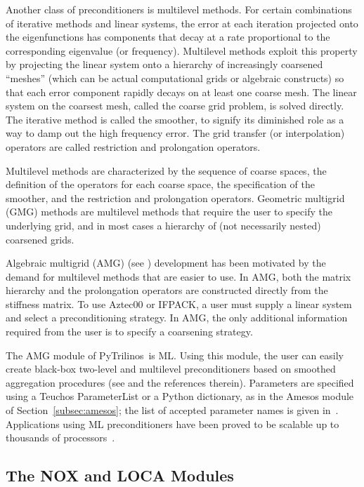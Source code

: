 \documentclass[acmtocl]{acmtrans2m}
\newcommand{\PyTrilinos}{{PyTrilinos}}
\begin{document}
Another class of preconditioners is multilevel methods. For certain
combinations of iterative methods and linear systems, the error at
each iteration projected onto the eigenfunctions has components that
decay at a rate proportional to the corresponding eigenvalue (or
frequency).  Multilevel methods exploit this property \cite{Briggs}
by projecting the linear system onto a hierarchy of increasingly
coarsened ``meshes'' (which can be actual computational grids or
algebraic constructs) so that each error component rapidly decays on
at least one coarse mesh.  The linear system on the coarsest mesh,
called the coarse grid problem, is solved directly. The iterative
method is called the smoother, to signify its diminished role as a
way to damp out the high frequency error.  The grid transfer (or
interpolation) operators are called restriction and prolongation
operators.

Multilevel methods are characterized by the sequence of coarse spaces,
the definition of the operators for each coarse space, the
specification of the smoother, and the restriction and prolongation
operators.  Geometric multigrid (GMG) methods are multilevel methods
that require the user to specify the underlying grid, and in most
cases a hierarchy of (not necessarily nested) coarsened grids.

Algebraic multigrid (AMG) (see \cite[Section 8]{Briggs}) development
has been motivated by the demand for multilevel methods that are
easier to use.  In AMG, both the matrix hierarchy and the prolongation
operators are constructed directly from the stiffness matrix.  To use
Aztec00 or IFPACK, a user must supply a linear system and select a
preconditioning strategy.  In AMG, the only additional information
required from the user is to specify a coarsening strategy.

The AMG module of \PyTrilinos\ is ML.  Using this module, the user can
easily create black-box two-level and multilevel preconditioners based
on smoothed aggregation procedures (see
\cite{sala04analysis,brezina97robust} and the references therein).
Parameters are specified using a Teuchos ParameterList or a Python
dictionary, as in the Amesos module of Section~\ref{subsec:amesos};
the list of accepted parameter names is given in~\cite{ml-guide}.
Applications using ML preconditioners have been proved to be scalable
up to thousands of processors~\cite{ijnme,shadid-jcp-dd-precond}.

\subsection{The NOX and LOCA Modules}
\label{subsec:nox}
\end{document}
